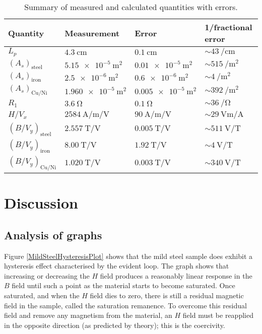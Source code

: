 \documentclass[12pt]{article}
\begin{document}
\begin{table}[H]
\centering
\begin{tabular}{| p{2cm} | p{4cm} | p{4cm} | p{4cm} |}
\hline
Quantity & Measurement & Error & 1/fractional error \\ \hline
$L_p$ & $\SI{4.3}{\centi\metre}$ & $\SI{0.1}{\centi\metre}$ & $\sim\SI{43}{\per\centi\metre}$ \\ \hline
$(A_s)_\text{steel}$ & $\SI{5.15e-5}{\metre\squared}$ & $\SI{0.01e-5}{\metre\squared}$ & $\sim\SI{515}{\per\metre\squared}$ \\ \hline
$(A_s)_\text{iron}$ & $\SI{2.5e-6}{\metre\squared}$ & $\SI{0.6e-6}{\metre\squared}$ & $\sim\SI{4}{\per\metre\squared}$ \\ \hline
$(A_s)_\text{Cu/Ni}$ & $\SI{1.960e-5}{\metre\squared}$ & $\SI{0.005e-5}{\metre\squared}$ & $\sim\SI{392}{\per\metre\squared}$ \\ \hline
$R_1$ & $\SI{3.6}{\ohm}$ & $\SI{0.1}{\ohm}$ & $\sim\SI{36}{\per\ohm}$ \\ \hline
$H/V_x$ & $\SI{2584}{\ampere\per\metre\per\volt}$ & $\SI{90}{\ampere\per\metre\per\volt}$ & $\sim\SI{29}{\volt\metre\per\ampere}$ \\ \hline
$(B/V_y)_\text{steel}$ & $\SI{2.557}{\tesla\per\volt}$ & $\SI{0.005}{\tesla\per\volt}$ & $\sim\SI{511}{\volt\per\tesla}$ \\ \hline
$(B/V_y)_\text{iron}$ & $\SI{8.00}{\tesla\per\volt}$ & $\SI{1.92}{\tesla\per\volt}$ & $\sim\SI{4}{\volt\per\tesla}$ \\ \hline
$(B/V_y)_\text{Cu/Ni}$ & $\SI{1.020}{\tesla\per\volt}$ & $\SI{0.003}{\tesla\per\volt}$ & $\sim\SI{340}{\volt\per\tesla}$ \\ \hline
\end{tabular}
\caption{Summary of measured and calculated quantities with errors.}
\label{measurementTable}
\end{table}




\section{Discussion}
\subsection{Analysis of graphs}
Figure \ref{MildSteelHysteresisPlot} shows that the mild steel sample does exhibit a hysteresis effect characterised by the evident loop. The graph shows that increasing or decreasing the $H$ field produces a reasonably linear response in the $B$ field until such a point as the material starts to become saturated. Once saturated, and when the $H$ field dies to zero, there is still a residual magnetic field in the sample, called the saturation remanence. To overcome this residual field and remove any magnetism from the material, an $H$ field must be reapplied in the opposite direction (as predicted by theory); this is the coercivity.
\end{document}
